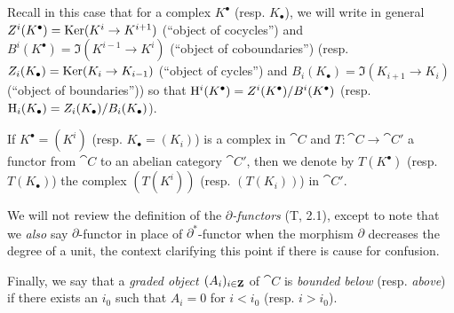 \begin{env}[11.2.1]
Recall in this case that for a complex $K^\bullet$ (resp. $K_\bullet$), we will write in general $Z^i(K^\bullet)=\Ker(K^i\to K^{i+1})$ (``object of cocycles'') and $B^i(K^\bullet)=\Im(K^{i-1}\to K^i)$ (``object of coboundaries'') (resp. $Z_i(K_\bullet)=\Ker(K_i\to K_{i-1})$ (``object of cycles'') and $B_i(K_\bullet)=\Im(K_{i+1}\to K_i)$ (``object of boundaries'')) so that $\mathrm{H}^i(K^\bullet)=Z^i(K^\bullet)/B^i(K^\bullet)$ (resp. $\mathrm{H}_i(K_\bullet)=Z_i(K_\bullet)/B_i(K_\bullet)$).

If $K^\bullet=(K^i)$ (resp. $K_\bullet=(K_i)$) is a complex in $\cat{C}$ and $T:\cat{C}\to\cat{C}'$ a functor from $\cat{C}$ to an abelian category $\cat{C}'$, then we denote by $T(K^\bullet)$ (resp. $T(K_\bullet)$) the complex $(T(K^i))$ (resp. $(T(K_i))$) in $\cat{C}'$.

We will not review the definition of the \emph{$\partial$-functors} (T, 2.1), except to note that we \emph{also} say $\partial$-functor in place of $\partial^*$-functor when the morphism $\partial$ decreases the degree of a unit, the context clarifying this point if there is cause for confusion.

Finally, we say that a \emph{graded object $(A_i)_{i\in\mathbf{Z}}$} of $\cat{C}$ is \emph{bounded below} (resp. \emph{above}) if there exists an $i_0$ such that $A_i=0$ for $i<i_0$ (resp. $i>i_0$).
\end{env}

